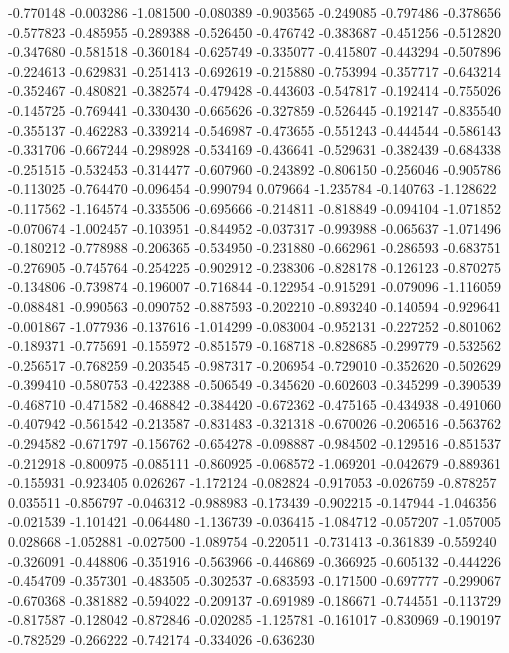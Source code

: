 -0.770148
-0.003286
-1.081500
-0.080389
-0.903565
-0.249085
-0.797486
-0.378656
-0.577823
-0.485955
-0.289388
-0.526450
-0.476742
-0.383687
-0.451256
-0.512820
-0.347680
-0.581518
-0.360184
-0.625749
-0.335077
-0.415807
-0.443294
-0.507896
-0.224613
-0.629831
-0.251413
-0.692619
-0.215880
-0.753994
-0.357717
-0.643214
-0.352467
-0.480821
-0.382574
-0.479428
-0.443603
-0.547817
-0.192414
-0.755026
-0.145725
-0.769441
-0.330430
-0.665626
-0.327859
-0.526445
-0.192147
-0.835540
-0.355137
-0.462283
-0.339214
-0.546987
-0.473655
-0.551243
-0.444544
-0.586143
-0.331706
-0.667244
-0.298928
-0.534169
-0.436641
-0.529631
-0.382439
-0.684338
-0.251515
-0.532453
-0.314477
-0.607960
-0.243892
-0.806150
-0.256046
-0.905786
-0.113025
-0.764470
-0.096454
-0.990794
0.079664
-1.235784
-0.140763
-1.128622
-0.117562
-1.164574
-0.335506
-0.695666
-0.214811
-0.818849
-0.094104
-1.071852
-0.070674
-1.002457
-0.103951
-0.844952
-0.037317
-0.993988
-0.065637
-1.071496
-0.180212
-0.778988
-0.206365
-0.534950
-0.231880
-0.662961
-0.286593
-0.683751
-0.276905
-0.745764
-0.254225
-0.902912
-0.238306
-0.828178
-0.126123
-0.870275
-0.134806
-0.739874
-0.196007
-0.716844
-0.122954
-0.915291
-0.079096
-1.116059
-0.088481
-0.990563
-0.090752
-0.887593
-0.202210
-0.893240
-0.140594
-0.929641
-0.001867
-1.077936
-0.137616
-1.014299
-0.083004
-0.952131
-0.227252
-0.801062
-0.189371
-0.775691
-0.155972
-0.851579
-0.168718
-0.828685
-0.299779
-0.532562
-0.256517
-0.768259
-0.203545
-0.987317
-0.206954
-0.729010
-0.352620
-0.502629
-0.399410
-0.580753
-0.422388
-0.506549
-0.345620
-0.602603
-0.345299
-0.390539
-0.468710
-0.471582
-0.468842
-0.384420
-0.672362
-0.475165
-0.434938
-0.491060
-0.407942
-0.561542
-0.213587
-0.831483
-0.321318
-0.670026
-0.206516
-0.563762
-0.294582
-0.671797
-0.156762
-0.654278
-0.098887
-0.984502
-0.129516
-0.851537
-0.212918
-0.800975
-0.085111
-0.860925
-0.068572
-1.069201
-0.042679
-0.889361
-0.155931
-0.923405
0.026267
-1.172124
-0.082824
-0.917053
-0.026759
-0.878257
0.035511
-0.856797
-0.046312
-0.988983
-0.173439
-0.902215
-0.147944
-1.046356
-0.021539
-1.101421
-0.064480
-1.136739
-0.036415
-1.084712
-0.057207
-1.057005
0.028668
-1.052881
-0.027500
-1.089754
-0.220511
-0.731413
-0.361839
-0.559240
-0.326091
-0.448806
-0.351916
-0.563966
-0.446869
-0.366925
-0.605132
-0.444226
-0.454709
-0.357301
-0.483505
-0.302537
-0.683593
-0.171500
-0.697777
-0.299067
-0.670368
-0.381882
-0.594022
-0.209137
-0.691989
-0.186671
-0.744551
-0.113729
-0.817587
-0.128042
-0.872846
-0.020285
-1.125781
-0.161017
-0.830969
-0.190197
-0.782529
-0.266222
-0.742174
-0.334026
-0.636230
